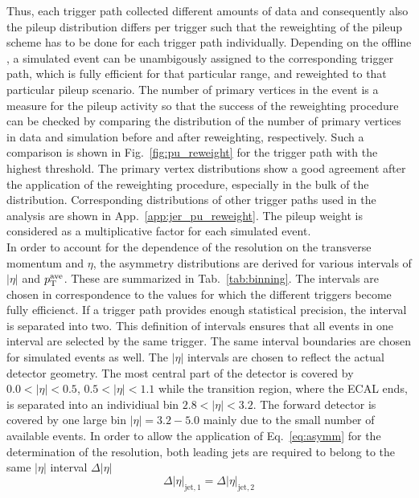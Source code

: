 Thus, each trigger path collected different amounts of data and consequently also the pileup distribution differs per trigger such that the reweighting of the pileup scheme has to be done for each trigger path individually. Depending on the offline \ptave, a simulated event can be unambigously assigned to the corresponding trigger path, which is fully efficient for that particular \pt range, and reweighted to that particular pileup scenario. The number of primary vertices in the event is a measure for the pileup activity so that the success of the reweighting procedure can be checked by comparing the distribution of the number of primary vertices in data and simulation before and after reweighting, respectively. Such a comparison is shown in Fig.~\ref{fig:pu_reweight} for the trigger path with the highest \ptave threshold. The primary vertex distributions show a good agreement after the application of the reweighting procedure, especially in the bulk of the distribution. Corresponding distributions of other trigger paths used in the analysis are shown in App.~\ref{app:jer_pu_reweight}. The pileup weight is considered as a multiplicative factor for each simulated event. \\
In order to account for the dependence of the resolution on the transverse momentum and $\eta$, the asymmetry distributions are derived for various intervals of $|\eta|$ and $p_{\text{T}}^\mathrm{ave}$. These are summarized in Tab.~\ref{tab:binning}. The \ptave intervals are chosen in correspondence to the \ptave values for which the different triggers become fully efficienct. If a trigger path provides enough statistical precision, the interval is separated into two. This definition of \ptave intervals ensures that all events in one \ptave interval are selected by the same trigger. The same interval boundaries are chosen for simulated events as well. The $|\eta|$ intervals are chosen to reflect the actual detector geometry. The most central part of the detector is covered by $ 0.0 < |\eta| < 0.5$, $0.5 < |\eta| < 1.1$ while the transition region, where the ECAL ends, is separated into an individiual bin $ 2.8 < |\eta| < 3.2$. The forward detector is covered by one large bin $|\eta| = 3.2 - 5.0$ mainly due to the small number of available events. In order to allow the application of Eq.~\ref{eq:asymm} for the determination of the resolution, both leading jets are required to belong to the same $|\eta|$ interval $\Delta |\eta|$
\begin{equation}
 \Delta |\eta|_{\mathrm{jet},1} = \Delta |\eta|_{\mathrm{jet},2}
\end{equation}
